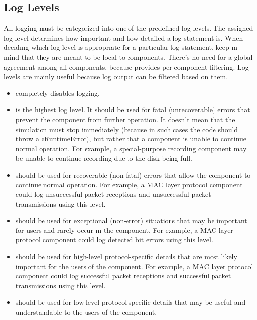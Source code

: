 \subsection{Log Levels}
\label{sec:sim-lib:log-levels}

All logging must be categorized into one of the predefined log levels. The
assigned log level determines how important and how detailed a log statement
is. When deciding which log level is appropriate for a particular log statement,
keep in mind that they are meant to be local to components. There's no need for
a global agreement among all components, because {\opp} provides per component
filtering. Log levels are mainly useful because log output can be filtered
based on them.

\begin{itemize}
  \item {} completely disables logging.
  \item {} is the highest log level. It should be used for
    fatal (unrecoverable) errors that prevent the component from further
    operation. It doesn't mean that the simulation must stop immediately
    (because in such cases the code should throw a cRuntimeError), but rather
    that a component is unable to continue normal operation. For example, a
    special-purpose recording component may be unable to continue recording due
    to the disk being full.
  \item {} should be used for recoverable (non-fatal)
    errors that allow the component to continue normal operation. For example,
    a MAC layer protocol component could log unsuccessful packet receptions and
    unsuccessful packet transmissions using this level.
  \item {} should be used for exceptional (non-error)
    situations that may be important for users and rarely occur in the
    component. For example, a MAC layer protocol component could log detected
    bit errors using this level.
  \item {} should be used for high-level protocol-specific
    details that are most likely important for the users of the component. For
    example, a MAC layer protocol component could log successful packet
    receptions and successful packet transmissions using this level.
  \item {} should be used for low-level protocol-specific
    details that may be useful and understandable to the users of the component.

\end{itemize}
